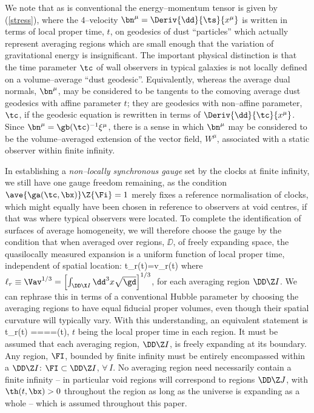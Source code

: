 \documentclass[12pt]{iopart}
\begin{document}
We note that as is conventional the energy--momentum tensor is given by
(\ref{stress}), where the 4--velocity $\bn^\mu=\Deriv{\dd}{\ts}{x^\mu}$ is
written in terms of local proper time, $t$, on geodesics of dust
``particles'' which actually represent averaging regions which are small
enough that the variation of gravitational energy is insignificant.
The important physical distinction is that the time parameter $\tc$ of wall
observers in typical galaxies is not locally defined on a volume--average
``dust geodesic''. Equivalently, whereas the average dual normals, $\bn^\mu$,
may be considered to be tangents to the comoving average
dust geodesics with affine parameter $t$; they are geodesics with
non--affine parameter, $\tc$, if the geodesic equation is rewritten in terms
of $\Deriv{\dd}{\tc}{x^\mu}$. Since $\bn^\mu=\gb(\tc)^{-1}\xi^\mu$, there
is a sense in which $\bn^\mu$ may be considered to be the volume--averaged
extension of the vector field, $W^\mu$, associated with a static observer
within finite infinity.

In establishing a {\em non--locally synchronous gauge} set by the clocks
at finite infinity, we still have one gauge freedom remaining, as
the condition $\ave{\ga(\tc,\bx)}\Z{\Fi}=1$ merely fixes a reference
normalisation of clocks, which might equally have been chosen in
reference to observers at void centres, if that was where typical observers
were located.
To complete the identification of surfaces of average homogeneity,
we will therefore choose the gauge by the condition that when averaged over
regions, $\DD$, of freely expanding space, the quasilocally measured expansion
is a uniform function of local proper time, independent of spatial location:
\beq
\Deriv\dd t{\ell_r(t)}=v_r(t)
\eeq
where $\ell_r\equiv\Vav^{1/3}=\left[\int_{\DD\X I}\dd^3x\sqrt{\gd}\right]
^{1/3}$, for each averaging region $\DD\Z I$.
We can rephrase this in terms of a conventional Hubble parameter by choosing
the averaging regions to have equal fiducial proper volumes, even though their
spatial curvature will typically vary. With this understanding, an
equivalent statement is
\Deriv\dd t{\ell_r(t)}
=\ave\th{}=\ave\th{}=\cdots=\bH(t),
\label{homo}\eeq
$t$ being the local proper time in each region. It must be assumed that
each averaging region, $\DD\Z I$, is freely expanding
at its boundary. Any region, $\FI$, bounded by finite infinity must be
entirely encompassed within a $\DD\Z I$: $\FI\subset\DD\Z I$, $\forall\,I$.
No averaging region need necessarily contain a finite infinity -- in
particular void regions will correspond to regions $\DD\Z J$, with
$\th(t,\bx)>0$ throughout the region as long as the universe is expanding
as a whole -- which is assumed throughout this paper.
\end{document}
